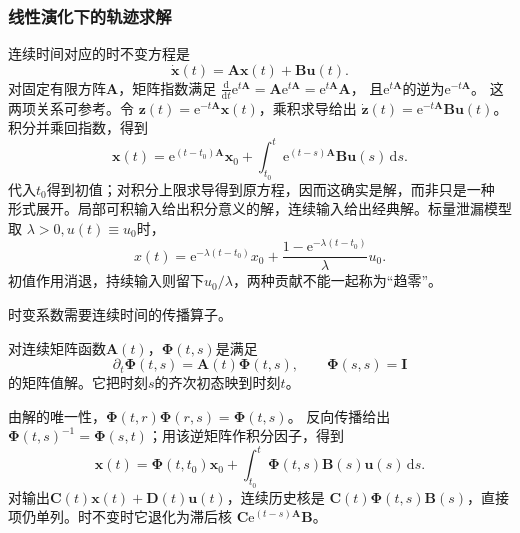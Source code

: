 \subsubsection{线性演化下的轨迹求解}
连续时间对应的时不变方程是
\begin{equation}
  \dot{\bm x}(t)=\bm A\bm x(t)+\bm B\bm u(t).
  \label{eq:dynamical-lti-continuous}
\end{equation}
对固定有限方阵$\bm A$，矩阵指数满足
$\frac{\mathrm d}{\mathrm dt}\mathrm e^{t\bm A}
=\bm A\mathrm e^{t\bm A}=\mathrm e^{t\bm A}\bm A$，
且$\mathrm e^{t\bm A}$的逆为$\mathrm e^{-t\bm A}$。
这两项关系可参考。令
$\bm z(t)=\mathrm e^{-t\bm A}\bm x(t)$，乘积求导给出
$\dot{\bm z}(t)=\mathrm e^{-t\bm A}\bm B\bm u(t)$。积分并乘回指数，得到
\begin{equation}
  \bm x(t)=\mathrm e^{(t-t_0)\bm A}\bm x_0+
    \int_{t_0}^t\mathrm e^{(t-s)\bm A}\bm B\bm u(s)\,\mathrm ds.
  \label{eq:dynamical-lti-variation-constants}
\end{equation}
代入$t_0$得到初值；对积分上限求导得到原方程，因而这确实是解，而非只是一种
形式展开。局部可积输入给出积分意义的解，连续输入给出经典解。标量泄漏模型取
$\lambda>0,u(t)\equiv u_0$时，
\[
  x(t)=\mathrm e^{-\lambda(t-t_0)}x_0+
    \frac{1-\mathrm e^{-\lambda(t-t_0)}}{\lambda}u_0.
\]
初值作用消退，持续输入则留下$u_0/\lambda$，两种贡献不能一起称为“趋零”。

时变系数需要连续时间的传播算子。
\begin{definition}[状态转移矩阵]
  \label{def:dynamical-state-transition-matrix}
  对连续矩阵函数$\bm A(t)$，$\bm\Phi(t,s)$是满足
  \begin{equation}
    \partial_t\bm\Phi(t,s)=\bm A(t)\bm\Phi(t,s),\qquad
    \bm\Phi(s,s)=\bm I
    \label{eq:dynamical-state-transition-matrix}
  \end{equation}
  的矩阵值解。它把时刻$s$的齐次初态映到时刻$t$。
\end{definition}
由解的唯一性，$\bm\Phi(t,r)\bm\Phi(r,s)=\bm\Phi(t,s)$。
反向传播给出$\bm\Phi(t,s)^{-1}=\bm\Phi(s,t)$；用该逆矩阵作积分因子，得到
\begin{equation}
  \bm x(t)=\bm\Phi(t,t_0)\bm x_0+
    \int_{t_0}^t\bm\Phi(t,s)\bm B(s)\bm u(s)\,\mathrm ds.
  \label{eq:dynamical-ltv-variation-constants}
\end{equation}
对输出$\bm C(t)\bm x(t)+\bm D(t)\bm u(t)$，连续历史核是
$\bm C(t)\bm\Phi(t,s)\bm B(s)$，直接项仍单列。时不变时它退化为滞后核
$\bm C\mathrm e^{(t-s)\bm A}\bm B$。

